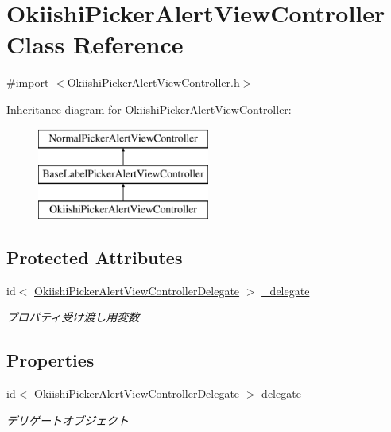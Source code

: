 \hypertarget{interface_okiishi_picker_alert_view_controller}{
\section{OkiishiPickerAlertViewController Class Reference}
\label{interface_okiishi_picker_alert_view_controller}
}


{\ttfamily \#import $<$OkiishiPickerAlertViewController.h$>$}

Inheritance diagram for OkiishiPickerAlertViewController:\begin{figure}[H]
\begin{center}
\leavevmode
\includegraphics[height=3.000000cm]{interface_okiishi_picker_alert_view_controller}
\end{center}
\end{figure}
\subsection*{Protected Attributes}
\begin{DoxyCompactItemize}
\item 
\hypertarget{interface_okiishi_picker_alert_view_controller_abc9889b054ca73244140a6b22563b4a1}{
id$<$ \hyperlink{protocol_okiishi_picker_alert_view_controller_delegate-p}{OkiishiPickerAlertViewControllerDelegate} $>$ \hyperlink{interface_okiishi_picker_alert_view_controller_abc9889b054ca73244140a6b22563b4a1}{\_\-delegate}}
\label{interface_okiishi_picker_alert_view_controller_abc9889b054ca73244140a6b22563b4a1}

\begin{DoxyCompactList}\small\item\em プロパティ受け渡し用変数 \end{DoxyCompactList}\end{DoxyCompactItemize}
\subsection*{Properties}
\begin{DoxyCompactItemize}
\item 
\hypertarget{interface_okiishi_picker_alert_view_controller_a14d04a657ef22eac66c25f7ce4bb2ce4}{
id$<$ \hyperlink{protocol_okiishi_picker_alert_view_controller_delegate-p}{OkiishiPickerAlertViewControllerDelegate} $>$ \hyperlink{interface_okiishi_picker_alert_view_controller_a14d04a657ef22eac66c25f7ce4bb2ce4}{delegate}}
\label{interface_okiishi_picker_alert_view_controller_a14d04a657ef22eac66c25f7ce4bb2ce4}

\begin{DoxyCompactList}\small\item\em デリゲートオブジェクト \end{DoxyCompactList}\end{DoxyCompactItemize}


